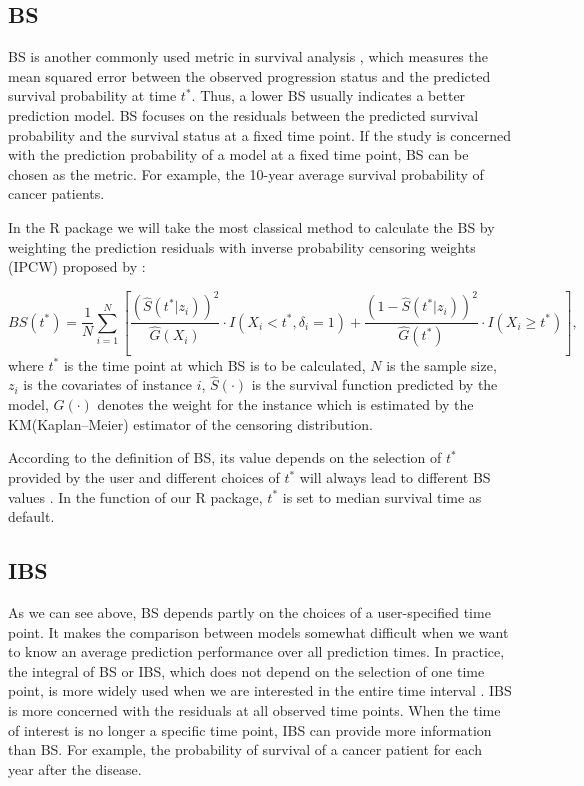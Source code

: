 \subsection{BS}

BS is another commonly used metric in survival analysis \citep{Steyerberg.2010, chicco.2021, imani.2019, pakbin.2018}, which measures the mean squared error between the observed progression status and the predicted survival probability at time $t^*$. Thus, a lower BS usually indicates a better prediction model. BS focuses on the residuals between the predicted survival probability and the survival status at a fixed time point. If the study is concerned with the prediction probability of a model at a fixed time point, BS can be chosen as the metric. For example, the 10-year average survival probability of cancer patients.

In the  R package we will take the most classical method to calculate the BS by weighting the prediction residuals with inverse probability censoring weights (IPCW) proposed by \cite{Graf.1999}:

\begin{equation}\label{BS}
BS(t^*)=\frac{1}{N}\sum_{i=1}^N\left[\frac{(\hat{S}(t^*|z_i))^2}{\hat{G}(X_i)}\cdot I(X_i<t^*,\delta_i=1)+\frac{(1-\hat{S}(t^*|z_i))^2}{\hat{G}(t^*)}\cdot I(X_i\ge t^*)\right],
\end{equation}
where $t^*$ is the time point at which BS is to be calculated, $N$ is the sample size, $z_i$ is the covariates of instance $i$, $\hat{S}(\cdot)$ is the survival function predicted by the model, $\hat{G}(\cdot)$ denotes the weight for the instance which is estimated by the KM(Kaplan–Meier) estimator of the censoring distribution.

According to the definition of BS, its value depends on the selection of $t^*$ provided by the user and different choices of $t^*$ will always lead to different BS values \citep{Chew.2001, Li.2021, Zhu.2012, Ji.2020}. In the  function of our  R package, $t^*$ is set to median survival time as default.



\subsection{IBS}

As we can see above, BS depends partly on the choices of a user-specified time point. It makes the comparison between models somewhat difficult when we want to know an average prediction performance over all prediction times. In practice, the integral of BS or IBS, which does not depend on the selection of one time point, is more widely used when we are interested in the entire time interval \citep{Zhu.2012, perianez.2016, bertens.2017}. IBS is more concerned with the residuals at all observed time points. When the time of interest is no longer a specific time point, IBS can provide more information than BS. For example, the probability of survival of a cancer patient for each year after the disease.

